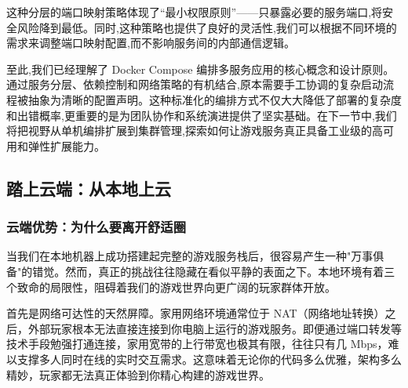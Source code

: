 这种分层的端口映射策略体现了``最小权限原则''——只暴露必要的服务端口,将安全风险降到最低。同时,这种策略也提供了良好的灵活性,我们可以根据不同环境的需求来调整端口映射配置,而不影响服务间的内部通信逻辑。

至此,我们已经理解了 Docker Compose 编排多服务应用的核心概念和设计原则。通过服务分层、依赖控制和网络策略的有机结合,原本需要手工协调的复杂启动流程被抽象为清晰的配置声明。这种标准化的编排方式不仅大大降低了部署的复杂度和出错概率,更重要的是为团队协作和系统演进提供了坚实基础。在下一节中,我们将把视野从单机编排扩展到集群管理,探索如何让游戏服务真正具备工业级的高可用和弹性扩展能力。



\subsection{踏上云端：从本地上云} %

\subsubsection{云端优势：为什么要离开舒适圈}

当我们在本地机器上成功搭建起完整的游戏服务栈后，很容易产生一种"万事俱备"的错觉。然而，真正的挑战往往隐藏在看似平静的表面之下。本地环境有着三个致命的局限性，阻碍着我们的游戏世界向更广阔的玩家群体开放。

首先是网络可达性的天然屏障。家用网络环境通常位于 NAT（网络地址转换）之后，外部玩家根本无法直接连接到你电脑上运行的游戏服务。即便通过端口转发等技术手段勉强打通连接，家用宽带的上行带宽也极其有限，往往只有几 Mbps，难以支撑多人同时在线的实时交互需求。这意味着无论你的代码多么优雅，架构多么精妙，玩家都无法真正体验到你精心构建的游戏世界。

